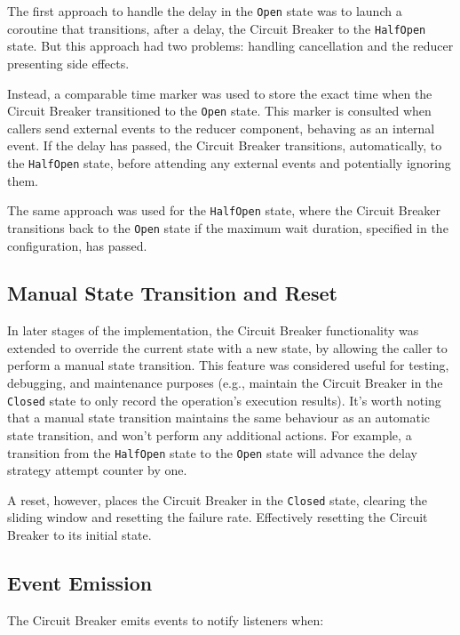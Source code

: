 The first approach to handle the delay in the \texttt{Open} state was
to launch a coroutine that transitions, after a delay, the Circuit Breaker to the \texttt{HalfOpen} state.
But this approach had two problems: handling cancellation and the reducer presenting side effects.

Instead,
a comparable time marker was used to store the exact time when the Circuit Breaker transitioned to the \texttt{Open} state.
This marker is consulted when callers send external events to the reducer component,
behaving as an internal event.
If the delay has passed, the Circuit Breaker transitions, automatically, to the \texttt{HalfOpen} state,
before attending any external events and potentially ignoring them.

The same approach was used for the \texttt{HalfOpen} state,
where the Circuit Breaker transitions back to the \texttt{Open} state
if the maximum wait duration, specified in the configuration, has passed.

\subsection{Manual State Transition and Reset}\label{subsec:cbreaker-manual-state-transition}

In later stages of the implementation, the Circuit Breaker functionality was extended to override the current state with a new state,
by allowing the caller to perform a manual state transition.
This feature was considered useful for testing, debugging,
and maintenance purposes (e.g., maintain the Circuit Breaker in the \texttt{Closed} state to only record the operation's execution results).
It's worth noting that a manual state transition maintains the same behaviour as an automatic state transition,
and won't perform any additional actions.
For example,
a transition from the \texttt{HalfOpen} state to the \texttt{Open} state will advance the delay strategy attempt counter by one.

A reset, however, places the Circuit Breaker in the \texttt{Closed} state,
clearing the sliding window and resetting the failure rate.
Effectively resetting the Circuit Breaker to its initial state.

\subsection{Event Emission}\label{subsec:cbreaker-event-emission}

The Circuit Breaker emits events to notify listeners when:

